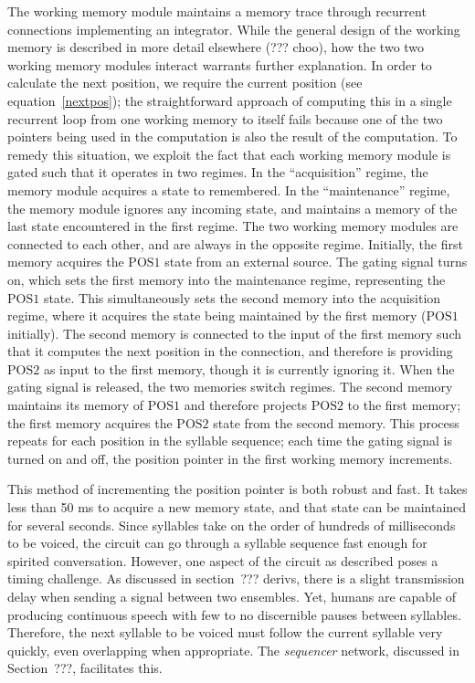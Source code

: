 The working memory module
maintains a memory trace
through recurrent connections
implementing an integrator.
While the general design of the working memory
is described in more detail elsewhere
(??? choo),
how the two two working memory modules
interact warrants further explanation.
In order to calculate the next position,
we require the current position
(see equation~\eqref{nextpos});
the straightforward approach
of computing this in a single recurrent loop
from one working memory to itself
fails because one of the two pointers
being used in the computation
is also the result of the computation.
To remedy this situation, we exploit the fact that
each working memory module is gated
such that it operates in two regimes.
In the ``acquisition'' regime,
the memory module acquires a state to remembered.
In the ``maintenance'' regime,
the memory module ignores any incoming state,
and maintains a memory of the last state
encountered in the first regime.
The two working memory modules
are connected to each other,
and are always in the opposite regime.
Initially, the first memory
acquires the $\text{POS1}$ state
from an external source.
The gating signal turns on,
which sets the first memory
into the maintenance regime,
representing the $\text{POS1}$ state.
This simultaneously sets the second memory
into the acquisition regime,
where it acquires the state
being maintained by the first memory
($\text{POS1}$ initially).
The second memory is connected
to the input of the first memory
such that it computes the
next position in the connection,
and therefore is providing
$\text{POS2}$ as input to the first memory,
though it is currently ignoring it.
When the gating signal is released,
the two memories switch regimes.
The second memory maintains
its memory of $\text{POS1}$
and therefore projects $\text{POS2}$
to the first memory;
the first memory acquires
the $\text{POS2}$ state from the second memory.
This process repeats for each position
in the syllable sequence;
each time the gating signal
is turned on and off,
the position pointer
in the first working memory increments.

This method of incrementing the position pointer
is both robust and fast.
It takes less than 50 ms to acquire
a new memory state,
and that state can be maintained
for several seconds.
Since syllables take
on the order of hundreds of milliseconds
to be voiced,
the circuit can go through a syllable sequence
fast enough for spirited conversation.
However, one aspect of the circuit as described
poses a timing challenge.
As discussed in section~??? derivs,
there is a slight transmission delay
when sending a signal between two ensembles.
Yet, humans are capable of producing
continuous speech with
few to no discernible pauses between syllables.
Therefore, the next syllable to be voiced
must follow the current syllable very quickly,
even overlapping when appropriate.
The \textit{sequencer} network,
discussed in Section~???,
facilitates this.

